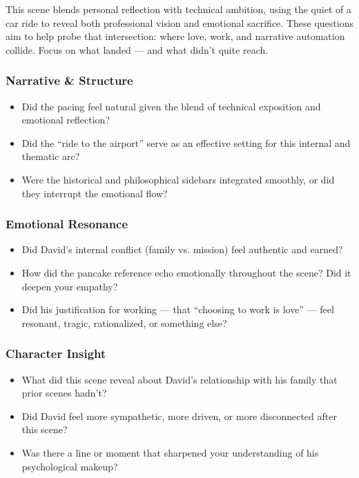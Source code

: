 This scene blends personal reflection with technical ambition, using the quiet of a car ride to reveal both professional vision and emotional sacrifice. These questions aim to help probe that intersection: where love, work, and narrative automation collide. Focus on what landed — and what didn’t quite reach.

\subsubsection*{Narrative \& Structure}

\begin{itemize}
  \item Did the pacing feel natural given the blend of technical exposition and emotional reflection?
  \item Did the “ride to the airport” serve as an effective setting for this internal and thematic arc?
  \item Were the historical and philosophical sidebars integrated smoothly, or did they interrupt the emotional flow?
\end{itemize}

\subsubsection*{Emotional Resonance}

\begin{itemize}
  \item Did David’s internal conflict (family vs. mission) feel authentic and earned?
  \item How did the pancake reference echo emotionally throughout the scene? Did it deepen your empathy?
  \item Did his justification for working — that “choosing to work is love” — feel resonant, tragic, rationalized, or something else?
\end{itemize}

\subsubsection*{Character Insight}

\begin{itemize}
  \item What did this scene reveal about David’s relationship with his family that prior scenes hadn’t?
  \item Did David feel more sympathetic, more driven, or more disconnected after this scene?
  \item Was there a line or moment that sharpened your understanding of his psychological makeup?
\end{itemize}

